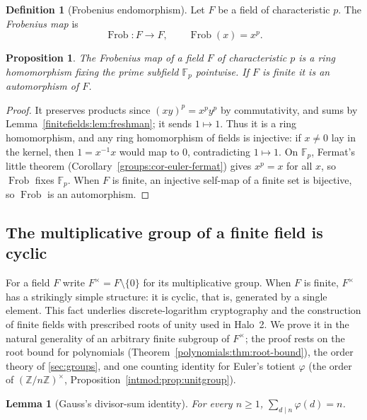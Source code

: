 \documentclass[11pt,a4paper]{article}
\newtheorem{lemma}[theorem]{Lemma}
\newtheorem{proposition}[theorem]{Proposition}
\theoremstyle{definition}
\newtheorem{definition}[theorem]{Definition}
\theoremstyle{remark}
\newcommand{\Z}{\ensuremath{\mathbb{Z}}}
\newcommand{\Fp}{\ensuremath{\mathbb{F}_{p}}}
\begin{document}
\begin{definition}[Frobenius endomorphism]
\label{finitefields:def:frobenius}
Let \(F\) be a field of characteristic \(p\). The \emph{Frobenius map} is
\[
  \operatorname{Frob}\colon F \to F, \qquad \operatorname{Frob}(x) = x^p.
\]
\end{definition}

\begin{proposition}
\label{finitefields:prop:frobhom}
The Frobenius map of a field \(F\) of characteristic \(p\) is a ring homomorphism fixing the prime subfield \(\Fp\) pointwise. If \(F\) is finite it is an automorphism of \(F\).
\end{proposition}

\begin{proof}
It preserves products since \((xy)^p = x^p y^p\) by commutativity, and sums by Lemma~\ref{finitefields:lem:freshman}; it sends \(1 \mapsto 1\). Thus it is a ring homomorphism, and any ring homomorphism of fields is injective: if \(x \neq 0\) lay in the kernel, then \(1 = x^{-1}x\) would map to \(0\), contradicting \(1 \mapsto 1\). On \(\Fp\), Fermat's little theorem (Corollary~\ref{groups:cor-euler-fermat}) gives \(x^p = x\) for all \(x\), so \(\operatorname{Frob}\) fixes \(\Fp\). When \(F\) is finite, an injective self-map of a finite set is bijective, so \(\operatorname{Frob}\) is an automorphism.
\end{proof}
\subsection{The multiplicative group of a finite field is cyclic}
\label{finitefields:subsec:cyclic}

For a field \(F\) write \(F^\times = F \setminus \{0\}\) for its multiplicative group. When \(F\) is finite, \(F^\times\) has a strikingly simple structure: it is cyclic, that is, generated by a single element. This fact underlies discrete-logarithm cryptography and the construction of finite fields with prescribed roots of unity used in Halo~2. We prove it in the natural generality of an arbitrary finite subgroup of \(F^\times\); the proof rests on the root bound for polynomials (Theorem~\ref{polynomials:thm:root-bound}), the order theory of \cref{sec:groups}, and one counting identity for Euler's totient \(\varphi\) (the order of \((\Z/n\Z)^\times\), Proposition~\ref{intmod:prop:unitgroup}).

\begin{lemma}[Gauss's divisor-sum identity]
\label{finitefields:lem:totient-sum}
For every \(n \ge 1\), \(\sum_{d \mid n} \varphi(d) = n\).
\end{lemma}
\end{document}
